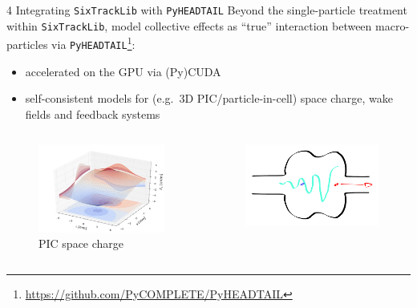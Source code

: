 \documentclass{beamer}
\begin{document}
\begin{frame}{4 Integrating \texttt{SixTrackLib} with \texttt{PyHEADTAIL}}
    Beyond the single-particle treatment within \texttt{SixTrackLib}, model collective effects as ``true'' interaction between macro-particles via \texttt{PyHEADTAIL}\footnote[frame]{\url{https://github.com/PyCOMPLETE/PyHEADTAIL}}:
    \begin{itemize}
        \item accelerated on the GPU via (Py)CUDA
        \item self-consistent models for  (e.g.\ 3D PIC/particle-in-cell) space charge, wake fields and feedback systems
    \end{itemize}
    
    \begin{columns}
        \begin{column}[b]{0.45\linewidth}
            \begin{figure}
                \includegraphics[width=\linewidth]{adrian_figs/Adrian_Fig3-624x435.png}
                \caption{PIC space charge}
            \end{figure}
        \end{column}
        \hfill
        \begin{column}[b]{0.45\linewidth}
            \begin{figure}
                \includegraphics[width=\linewidth]{adrian_figs/wakefield.pdf}

\end{figure}
\end{column}
\end{columns}
\end{frame}
\end{document}
